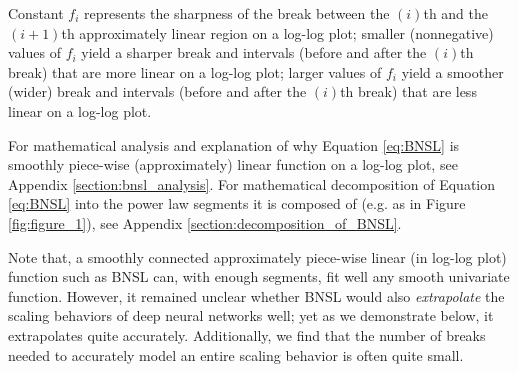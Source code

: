 \documentclass{article} %
\begin{document}
Constant $f_i$ represents the sharpness of the break between the $(i)$th and the $(i+1)$th approximately linear region on a log-log plot; smaller (nonnegative) values of $f_i$ yield a sharper break and intervals (before and after the $(i)$th break) that are more linear on a log-log plot; larger values of $f_i$ yield a smoother (wider) break and intervals (before and after the $(i)$th break) that are less linear on a log-log plot.

\vspace{-0.65mm}

For mathematical analysis and explanation of why Equation \ref{eq:BNSL} is smoothly piece-wise (approximately) linear function on a log-log plot, see Appendix \ref{section:bnsl_analysis}. For mathematical decomposition of Equation \ref{eq:BNSL} into the power law segments it is composed of (e.g. as in Figure \ref{fig:figure_1}), see Appendix \ref{section:decomposition_of_BNSL}.

\vspace{-0.65mm}


Note that, a smoothly connected approximately piece-wise linear (in log-log plot) function such as BNSL can, with enough segments, fit well any smooth univariate function. However, it remained unclear whether BNSL would also {\em extrapolate} the scaling behaviors of deep neural networks well; yet as we demonstrate below, it extrapolates quite accurately. Additionally, we find that the number of breaks needed to accurately model an entire scaling behavior is often quite small.



\end{document}
